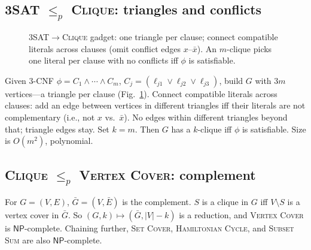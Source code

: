 \subsection{\texorpdfstring{3SAT $\le_p$ \textsc{Clique}}{3SAT <=p Clique}: triangles and conflicts}
\begin{figure}[h]\centering
{}
\caption{3SAT$\to$\textsc{Clique} gadget: one triangle per clause; connect compatible literals across clauses (omit conflict edges $x$--$\bar x$). An $m$-clique picks one literal per clause with no conflicts iff $\phi$ is satisfiable.}
\label{fig:3sat-clique-gadget}
\end{figure}
Given 3-CNF $\phi=C_1\wedge\cdots\wedge C_m$, $C_j=(\ell_{j1}\vee\ell_{j2}\vee\ell_{j3})$, build $G$ with $3m$ vertices---a triangle per clause (Fig.~\ref{fig:3sat-clique-gadget}). Connect compatible literals across clauses: add an edge between vertices in different triangles iff their literals are not complementary (i.e., not $x$ vs.\ $\bar x$). No edges within different triangles beyond that; triangle edges stay. Set $k=m$. Then $G$ has a $k$-clique iff $\phi$ is satisfiable. Size is $O(m^2)$, polynomial.

\subsection{\texorpdfstring{\textsc{Clique} $\le_p$ \textsc{Vertex Cover}}{Clique <=p Vertex Cover}: complement}
For $G=(V,E)$, $\bar G=(V,\bar E)$ is the complement. $S$ is a clique in $G$ iff $V\setminus S$ is a vertex cover in $\bar G$. So $(G,k)\mapsto(\bar G,|V|-k)$ is a reduction, and \textsc{Vertex Cover} is $\mathsf{NP}$-complete. Chaining further, \textsc{Set Cover}, \textsc{Hamiltonian Cycle}, and \textsc{Subset Sum} are also $\mathsf{NP}$-complete.

